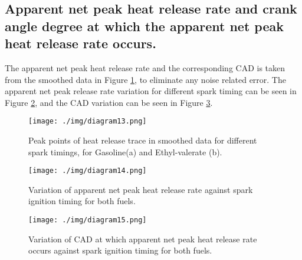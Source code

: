 \subsection*{Apparent net peak heat release rate and crank angle degree at which the apparent net peak heat release rate occurs.}
The apparent net peak heat release rate and the corresponding CAD is taken from the smoothed data in Figure \ref{q1-f6}, to eliminate any noise related error. The apparent net peak release rate variation for different spark timing can be seen in Figure \ref{q1-f7}, and the CAD variation can be seen in Figure \ref{q1-f8}.
\begin{figure}[H]
    \centering
    \texttt{[image: ./img/diagram13.png]}
    \caption{Peak points of heat release trace in smoothed data for different spark timings, for Gasoline(a) and Ethyl-valerate (b).}
    \label{q1-f6}
\end{figure}
\begin{figure}[H]
    \centering
    \texttt{[image: ./img/diagram14.png]}
    \caption{Variation of apparent net peak heat release rate against spark ignition timing for both fuels.}
    \label{q1-f7}
\end{figure}
\begin{figure}[H]
    \centering
    \texttt{[image: ./img/diagram15.png]}
    \caption{Variation of CAD at which apparent net peak heat release rate occurs against spark ignition timing for both fuels.}
    \label{q1-f8}
\end{figure}
